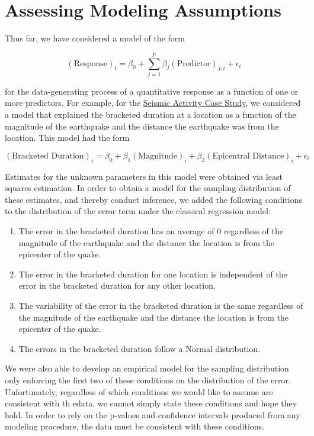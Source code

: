 \documentclass[]{book}
\providecommand{\tightlist}{%
  \setlength{\itemsep}{0pt}\setlength{\parskip}{0pt}}
\theoremstyle{definition}
\theoremstyle{definition}
\theoremstyle{definition}
\theoremstyle{remark}
\begin{document}
\chapter{Assessing Modeling Assumptions}\label{Regassessment}

Thus far, we have considered a model of the form

\[(\text{Response})_i = \beta_0 + \sum_{j=1}^{p} \beta_j (\text{Predictor})_{j,i} + \epsilon_i\]

for the data-generating process of a quantitative response as a function
of one or more predictors. For example, for the
\protect\hyperlink{CaseGreece}{Seismic Activity Case Study}, we
considered a model that explained the bracketed duration at a location
as a function of the magnitude of the earthquake and the distance the
earthquake was from the location. This model had the form

\[(\text{Bracketed Duration})_i = \beta_0 + \beta_1(\text{Magnitude})_i + \beta_2(\text{Epicentral Distance})_i + \epsilon_i\]

Estimates for the unknown parameters in this model were obtained via
least squares estimation. In order to obtain a model for the sampling
distribution of these estimates, and thereby conduct inference, we added
the following conditions to the distribution of the error term under the
classical regression model:

\begin{enumerate}
\def\labelenumi{\arabic{enumi}.}
\tightlist
\item
  The error in the bracketed duration has an average of 0 regardless of
  the magnitude of the earthquake and the distance the location is from
  the epicenter of the quake.
\item
  The error in the bracketed duration for one location is independent of
  the error in the bracketed duration for any other location.
\item
  The variability of the error in the bracketed duration is the same
  regardless of the magnitude of the earthquake and the distance the
  location is from the epicenter of the quake.
\item
  The errors in the bracketed duration follow a Normal distribution.
\end{enumerate}

We were also able to develop an empirical model for the sampling
distribution only enforcing the first two of these conditions on the
distribution of the error. Unfortunately, regardless of which conditions
we would like to assume are consistent with th edata, we cannot simply
state these conditions and hope they hold. In order to rely on the
p-values and confidence intervals produced from any modeling procedure,
the data must be consistent with these conditions.
\end{document}
